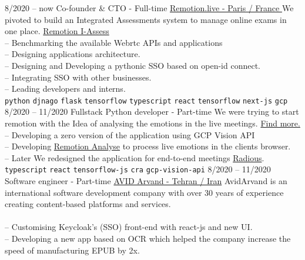 \documentclass[9pt]{developercv}
\begin{document}
\begin{entrylist}
	\entry
	{8/2020 -- now}
	{Co-founder \& CTO - Full-time}
	{\href{https://remotion.live/}{Remotion.live - Paris / France }}
	{We pivoted to build an Integrated Assessments system to manage online exams in one place.
		\href{https://remotion.live/} {Remotion I-Assess} \\
		-- Benchmarking the available Webrtc APIs and applications  \\
		-- Designing applications architecture. \\
		-- Designing and Developing a pythonic SSO based on open-id connect. \\
		-- Integrating SSO with other businesses. \\
		-- Leading developers and interns. \\
		\texttt{python}\slashsep
		\texttt{djnago}\slashsep
		\texttt{flask}\slashsep
		\texttt{tensorflow}\slashsep
		\texttt{typescript}\slashsep
		\texttt{react}\slashsep
		\texttt{tensorflow}\slashsep
		\texttt{next-js}\slashsep
		\texttt{gcp}\slashsep
	}
	\entry
	{8/2020 -- 11/2020}
	{Fullstack Python developer - Part-time}
	{}
	{We were trying to start remotion with the Idea of analysing the emotions in the live meetings.
		\href{https://remotion.live/} {Find more.} \\
		-- Developing a zero version of the application using GCP Vision API \\
		-- Developing \href{https://analyse.remotion.live/} {Remotion Analyse} to process live emotions in the clients browser. \\
		-- Later We redesigned the application for end-to-end meetings \href{https://radious.fr/} {Radious}. \\
		\texttt{typescript}\slashsep
		\texttt{react}\slashsep
		\texttt{tensorflow-js}\slashsep
		\texttt{cra}\slashsep
		\texttt{gcp-vision-api}\slashsep
	}
	\entry
	{8/2020 -- 11/2020}
	{Software engineer - Part-time}
	{
		\href{https://www.linkedin.com/company/avid-technology-development/}{AVID Arvand - Tehran / Iran}}
	{
		AvidArvand is an international software development company with over 30 years of experience creating content-based platforms and services. \\\\
		-- Customising Keycloak's (SSO) front-end with react-js and new UI. \\
		-- Developing a new app based on OCR which helped
		the company increase the speed of manufacturing EPUB by 2x. \\
}
\end{entrylist}
\end{document}

